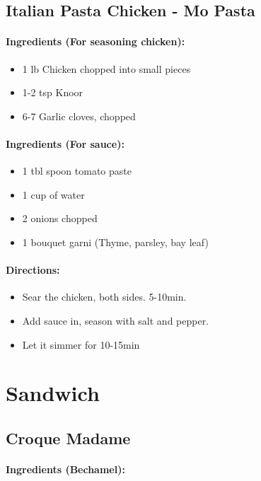 \documentclass{article}
\begin{document}
\subsection{Italian Pasta Chicken - Mo Pasta}

\paragraph{Ingredients (For seasoning chicken):}
\begin{itemize}
	\item 1 lb Chicken chopped into small pieces
	\item 1-2 tsp Knoor
	\item 6-7 Garlic cloves, chopped
\end{itemize}

\paragraph{Ingredients (For sauce):}
\begin{itemize}
	\item 1 tbl spoon tomato paste
	\item 1 cup of water
	\item 2 onions chopped
	\item 1 bouquet garni (Thyme, parsley, bay leaf)
\end{itemize}

\paragraph{Directions:}
\begin{itemize}
	\item Sear the chicken, both sides. 5-10min.
	\item Add sauce in, season with salt and pepper.
	\item Let it simmer for 10-15min
\end{itemize}

\section{Sandwich}

\subsection{Croque Madame}

\paragraph{Ingredients (Bechamel):}
\end{document}
